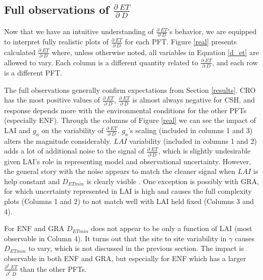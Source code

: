 \documentclass[draft,linenumbers]{agujournal}
\begin{document}
\subsection{Full observations of $\frac{\partial \; ET}{\partial \; D}$}

Now that we have an intuitive understanding of $\frac{\partial \; ET}{\partial \; D}$'s behavior, we are equipped to interpret fully realistic plots of $\frac{\partial \; ET}{\partial \; D}$ for each PFT. Figure \ref{real} presents calculated $\frac{\partial \; ET}{\partial \; D}$ where, unless otherwise noted, all variables in Equation \ref{d_et} are allowed to vary. Each column is a different quantity related to $\frac{\partial \; ET}{\partial \; D}$, and each row is a different PFT.

The full observations generally confirm expectations from Section \ref{results}. CRO has the most positive values of $\frac{\partial \; ET}{\partial \; D}$, $\frac{\partial \; ET}{\partial \; D}$ is almost always negative for CSH, and response depends more with the environmental conditions for the other PFTs (especially ENF). Through the columns of Figure \ref{real} we can see the impact of LAI and $g_a$ on the variability of $\frac{\partial \; ET}{\partial \; D}$. $g_a$'s scaling (included in columns 1 and 3) alters the magnitude considerably. $LAI$ variability (included in columns 1 and 2) adds a lot of additional noise to the signal of $\frac{\partial \; ET}{\partial \; D}$, which is slightly undesirable given LAI's role in representing model and observational uncertainty. However, the general story with the noise appears to match the cleaner signal when $LAI$ is help constant and $D_{ETmin}$ is clearly visible . One exception is possibly with GRA, for which uncertainty represented in LAI is high and causes the full complexity plots (Columns 1 and 2) to not match well with LAI held fixed (Columns 3 and 4).

For ENF and GRA $D_{ETmin}$ does not appear to be only a function of LAI (most observable in Column 4). It turns out that the site to site variability in $\gamma$ causes $D_{ETmin}$ to vary, which is not discussed in the previous section. The impact is observable in both ENF and GRA, but especially for ENF which has a larger $\frac{\partial^2 \; ET}{\partial^2 \; D}$ than the other PFTs. 
\end{document}
